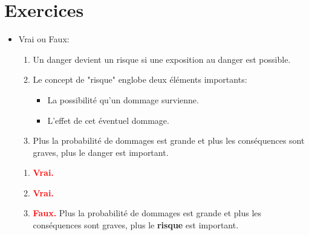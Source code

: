 \documentclass[class=article, crop=false]{standalone}
\begin{document}
\section{Exercices}





\begin{itemize}





\item Vrai ou Faux:
\begin{enumerate}
    \item Un danger devient un risque si une exposition au danger est possible.
    \item Le concept de "risque" englobe deux éléments importants:
    \begin{itemize}
        \item La possibilité qu’un dommage survienne.
        \item L’effet de cet éventuel dommage.
    \end{itemize}
    \item Plus la probabilité de dommages est grande et plus les conséquences sont graves, plus le danger est important.
\end{enumerate}
\begin{example}
\begin{enumerate}
    \item \textcolor{red}{\textbf{Vrai.}}
    \item \textcolor{red}{\textbf{Vrai.}}
    \item \textcolor{red}{\textbf{Faux.}} Plus la probabilité de dommages est grande et plus les conséquences sont graves, plus le \textbf{risque} est important.
\end{enumerate}
\end{example}






\end{itemize}
\end{document}
